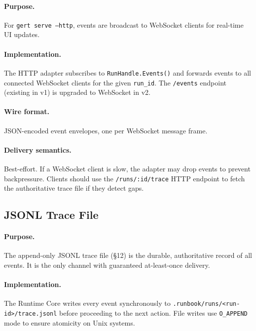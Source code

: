 \paragraph{Purpose.} For \texttt{gert serve --http}, events are broadcast to WebSocket clients for real-time UI updates.

\paragraph{Implementation.} The HTTP adapter subscribes to \texttt{RunHandle.Events()} and forwards events to all connected WebSocket clients for the given \texttt{run\_id}. The \texttt{/events} endpoint (existing in v1) is upgraded to WebSocket in v2.

\paragraph{Wire format.} JSON-encoded event envelopes, one per WebSocket message frame.

\paragraph{Delivery semantics.} Best-effort. If a WebSocket client is slow, the adapter may drop events to prevent backpressure. Clients should use the \texttt{/runs/:id/trace} HTTP endpoint to fetch the authoritative trace file if they detect gaps.


\subsection{JSONL Trace File}

\paragraph{Purpose.} The append-only JSONL trace file (§12) is the durable, authoritative record of all events. It is the only channel with guaranteed at-least-once delivery.

\paragraph{Implementation.} The Runtime Core writes every event synchronously to \texttt{.runbook/runs/<run-id>/trace.jsonl} before proceeding to the next action. File writes use \texttt{O\_APPEND} mode to ensure atomicity on Unix systems.

